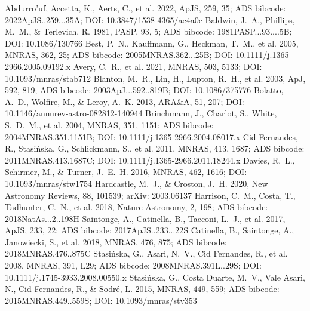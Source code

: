 \documentclass[twocolumn]{aastex631}
\begin{document}

\begin{thebibliography}{}
 Abdurro'uf, Accetta, K., Aerts, C., et al. 2022, ApJS, 259, 35; ADS bibcode: 2022ApJS..259...35A; DOI: 10.3847/1538-4365/ac4a0c
 Baldwin, J.~A., Phillips, M.~M., \& Terlevich, R. 1981, PASP, 93, 5; ADS bibcode: 1981PASP...93....5B; DOI: 10.1086/130766
 Best, P.~N., Kauffmann, G., Heckman, T.~M., et al. 2005, MNRAS, 362, 25; ADS bibcode: 2005MNRAS.362...25B; DOI: 10.1111/j.1365-2966.2005.09192.x
 Avery, C.~R., et al. 2021, MNRAS, 503, 5133; DOI: 10.1093/mnras/stab712
 Blanton, M.~R., Lin, H., Lupton, R.~H., et al. 2003, ApJ, 592, 819; ADS bibcode: 2003ApJ...592..819B; DOI: 10.1086/375776
 Bolatto, A.~D., Wolfire, M., \& Leroy, A.~K. 2013, ARA\&A, 51, 207; DOI: 10.1146/annurev-astro-082812-140944
 Brinchmann, J., Charlot, S., White, S.~D.~M., et al. 2004, MNRAS, 351, 1151; ADS bibcode: 2004MNRAS.351.1151B; DOI: 10.1111/j.1365-2966.2004.08017.x
 Cid Fernandes, R., Stasi{\'n}ska, G., Schlickmann, S., et al. 2011, MNRAS, 413, 1687; ADS bibcode: 2011MNRAS.413.1687C; DOI: 10.1111/j.1365-2966.2011.18244.x
 Davies, R.~L., Schirmer, M., \& Turner, J.~E.~H. 2016, MNRAS, 462, 1616; DOI: 10.1093/mnras/stw1754
 Hardcastle, M.~J., \& Croston, J.~H. 2020, New Astronomy Reviews, 88, 101539; arXiv: 2003.06137
 Harrison, C.~M., Costa, T., Tadhunter, C.~N., et al. 2018, Nature Astronomy, 2, 198; ADS bibcode: 2018NatAs...2..198H
 Saintonge, A., Catinella, B., Tacconi, L.~J., et al. 2017, ApJS, 233, 22; ADS bibcode: 2017ApJS..233...22S
 Catinella, B., Saintonge, A., Janowiecki, S., et al. 2018, MNRAS, 476, 875; ADS bibcode: 2018MNRAS.476..875C
 Stasi{\'n}ska, G., Asari, N.~V., Cid Fernandes, R., et al. 2008, MNRAS, 391, L29; ADS bibcode: 2008MNRAS.391L..29S; DOI: 10.1111/j.1745-3933.2008.00550.x
 Stasi{\'n}ska, G., Costa Duarte, M.~V., Vale Asari, N., Cid Fernandes, R., \& Sodr{\'e}, L. 2015, MNRAS, 449, 559; ADS bibcode: 2015MNRAS.449..559S; DOI: 10.1093/mnras/stv353

\end{thebibliography}
\end{document}
